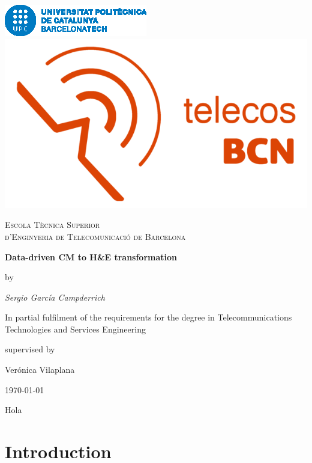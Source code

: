 \documentclass[a4paper,12pt,titlepage]{article}
\begin{document}
\begin{titlepage}
\centering

\includegraphics[height=0.07\textheight]{logo_barcelonatech}\hspace{0.5cm}
\includegraphics[height=0.07\textheight]{logo_telecos_2018}\par\vspace{1cm}

{\scshape\LARGE Escola Tècnica Superior \\ d'Enginyeria de Telecomunicació de Barcelona \par}\vspace{3mm}

{\huge\bfseries Data-driven CM to H\&E transformation\par}\vspace{2cm}

by\par
{\Large\itshape Sergio García Campderrich\par}
In partial fulfilment of the requirements for the degree in Telecommunications Technologies and Services Engineering\vfill

supervised by\par
Verónica Vilaplana

\vfill

{\large \today\par}
\end{titlepage}

\clearpage
\thispagestyle{empty}
\null\newpage
{}

Hola \cite{Combalia2019}

\section{Introduction}

\end{document}
